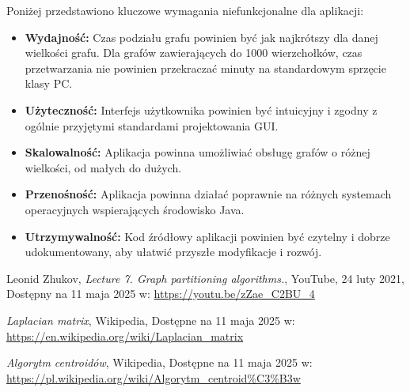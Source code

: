 \documentclass{article}
\begin{document}
    Poniżej przedstawiono kluczowe wymagania niefunkcjonalne dla aplikacji:
    
    \begin{itemize}
        \item \textbf{Wydajność:} Czas podziału grafu powinien być jak najkrótszy dla danej wielkości grafu. Dla grafów zawierających do 1000 wierzchołków, czas przetwarzania nie powinien przekraczać minuty na standardowym sprzęcie klasy PC.
        \item \textbf{Użyteczność:} Interfejs użytkownika powinien być intuicyjny i zgodny z ogólnie przyjętymi standardami projektowania GUI.
        \item \textbf{Skalowalność:} Aplikacja powinna umożliwiać obsługę grafów o różnej wielkości, od małych do dużych.
        \item \textbf{Przenośność:} Aplikacja powinna działać poprawnie na różnych systemach operacyjnych wspierających środowisko Java.
        \item \textbf{Utrzymywalność:} Kod źródłowy aplikacji powinien być czytelny i dobrze udokumentowany, aby ułatwić przyszłe modyfikacje i rozwój.
    \end{itemize}


    

\begin{thebibliography}{9}

Leonid Zhukov, \textit{Lecture 7. Graph partitioning algorithms.}, YouTube, 24 luty 2021, Dostępny na 11 maja 2025 w: \url{https://youtu.be/zZae_C2BU_4}

\textit{Laplacian matrix}, Wikipedia, Dostępne na 11 maja 2025 w: \url{https://en.wikipedia.org/wiki/Laplacian_matrix}

\textit{Algorytm centroidów}, Wikipedia, Dostępne na 11 maja 2025 w:
\url{https://pl.wikipedia.org/wiki/Algorytm_centroid%C3%B3w}

\end{thebibliography}
\end{document}
